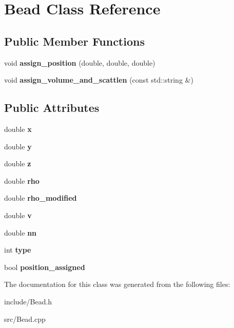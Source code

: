 \hypertarget{class_bead}{}\section{Bead Class Reference}
\label{class_bead}
\subsection*{Public Member Functions}
\begin{DoxyCompactItemize}
\item 
\mbox{\label{class_bead_a5d85b32496750ad6d9fdbc36102c2e32}} 
void {\bfseries assign\+\_\+position} (double, double, double)
\item 
\mbox{\label{class_bead_a0ae6fb3e5a98af2dc1f451cddd05a0aa}} 
void {\bfseries assign\+\_\+volume\+\_\+and\+\_\+scattlen} (const std\+::string \&)
\end{DoxyCompactItemize}
\subsection*{Public Attributes}
\begin{DoxyCompactItemize}
\item 
\mbox{\label{class_bead_ae6045b9bd5fff15b591b6c07facd612d}} 
double {\bfseries x}
\item 
\mbox{\label{class_bead_a37003c916d4b2a08db3fd9b6cc0ad368}} 
double {\bfseries y}
\item 
\mbox{\label{class_bead_a5fa9188e0ae7b7e81cc44c815ed4c8c4}} 
double {\bfseries z}
\item 
\mbox{\label{class_bead_a67c6fba59828a2e45547583c527b8296}} 
double {\bfseries rho}
\item 
\mbox{\label{class_bead_af2bbc0c68876ef8661c70d2d3405cc40}} 
double {\bfseries rho\+\_\+modified}
\item 
\mbox{\label{class_bead_a48acae41ba705ecf206f83b8e541236f}} 
double {\bfseries v}
\item 
\mbox{\label{class_bead_a71d729f35a3647962ba1b7ec940a17ef}} 
double {\bfseries nn}
\item 
\mbox{\label{class_bead_a1c59ce8e05e2db10b64849c431c7d757}} 
int {\bfseries type}
\item 
\mbox{\label{class_bead_a497b8e42163ca9b86701179c0afd3bcb}} 
bool {\bfseries position\+\_\+assigned}
\end{DoxyCompactItemize}


The documentation for this class was generated from the following files\+:\begin{DoxyCompactItemize}
\item 
include/Bead.\+h\item 
src/Bead.\+cpp\end{DoxyCompactItemize}
